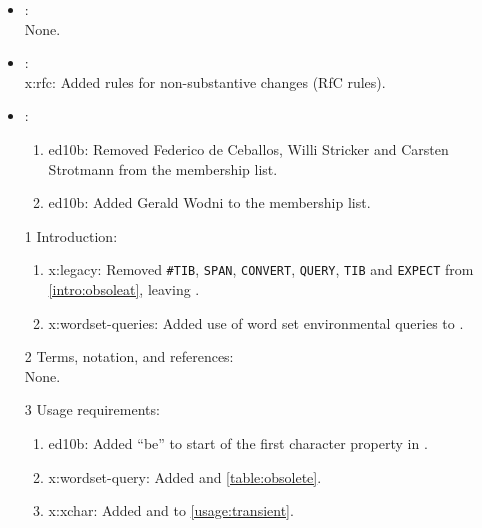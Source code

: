 	\begin{itemize}
	\item {}: \\
		None.

	\item {}: \\
		\textsf{x:rfc}: Added rules for non-substantive changes (RfC rules).

	\item {}:
		\begin{enumerate}
		\item \textsf{ed10b}: Removed Federico de Ceballos, Willi Stricker
			and Carsten Strotmann from the \linebreak membership list.
		\item \textsf{ed10b}: Added Gerald Wodni to the membership list.
		\end{enumerate}

	\item[1] Introduction:
		\begin{enumerate}
		\item \textsf{x:legacy}: Removed \texttt{\#TIB}, \texttt{SPAN},
			\texttt{CONVERT}, \texttt{QUERY}, \texttt{TIB} and \texttt{EXPECT}
			from \ref{intro:obsoleat}, leaving .

		\item \textsf{x:wordset-queries}: Added use of word set environmental
			queries to .
		\end{enumerate}

	\item[2] Terms, notation, and references: \\
		None.

	\item[3] Usage requirements:
		\begin{enumerate}
		\item \textsf{ed10b}: Added ``be'' to start of the first character
			property in .
		\item \textsf{x:wordset-query}: Added  and
			\ref{table:obsolete}.
		\item \textsf{x:xchar}: Added  and  to
			\ref{usage:transient}.
		\end{enumerate}


\end{itemize}
